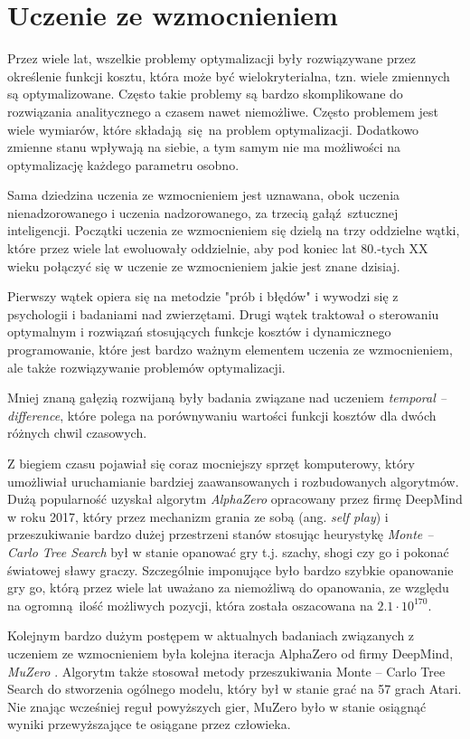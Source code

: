 \chapter{Uczenie ze wzmocnieniem}
\label{cha:rozdzial3}

Przez wiele lat, wszelkie problemy optymalizacji były rozwiązywane przez 
określenie funkcji kosztu, która może być wielokryterialna, tzn. wiele 
zmiennych są optymalizowane. Często takie problemy są bardzo skomplikowane do 
rozwiązania analitycznego a czasem nawet niemożliwe. Często problemem jest 
wiele wymiarów, które składają się na problem optymalizacji. Dodatkowo zmienne 
stanu wpływają na siebie, a tym samym nie ma możliwości na optymalizację 
każdego parametru osobno.

Sama dziedzina uczenia ze wzmocnieniem jest uznawana, obok uczenia 
nienadzorowanego i uczenia nadzorowanego, za trzecią gałąź sztucznej 
inteligencji. Początki uczenia ze wzmocnieniem się dzielą na trzy oddzielne 
wątki, które przez wiele lat ewoluowały oddzielnie, aby pod koniec lat 80.-tych 
XX wieku połączyć się w uczenie ze wzmocnieniem jakie jest znane dzisiaj.

Pierwszy wątek opiera się na metodzie "prób i błędów" i wywodzi się z 
psychologii i badaniami nad zwierzętami. Drugi wątek traktował o sterowaniu 
optymalnym i rozwiązań stosujących funkcje kosztów i dynamicznego 
programowanie, które jest bardzo ważnym elementem uczenia ze wzmocnieniem, ale 
także rozwiązywanie problemów optymalizacji.

Mniej znaną gałęzią rozwijaną były badania związane nad uczeniem 
\textit{temporal -- difference}, które polega na porównywaniu wartości funkcji 
kosztów dla dwóch różnych chwil czasowych. 

Z biegiem czasu pojawiał się coraz mocniejszy sprzęt komputerowy, który 
umożliwiał uruchamianie bardziej zaawansowanych i rozbudowanych algorytmów. 
Dużą popularność uzyskał algorytm \textit{AlphaZero} opracowany przez firmę 
DeepMind w roku 2017, który przez mechanizm grania ze sobą (ang. \textit{self 
play}) i przeszukiwanie bardzo dużej przestrzeni stanów stosując heurystykę 
\textit{Monte -- Carlo Tree Search} był w stanie opanować gry t.j. szachy, 
shogi czy go i pokonać światowej sławy graczy. Szczególnie imponujące było 
bardzo szybkie opanowanie gry go, którą przez wiele lat uważano za niemożliwą 
do opanowania, ze względu na ogromną ilość możliwych pozycji, która została 
oszacowana na $2.1 \cdot 10^{170}$. 

Kolejnym bardzo dużym postępem w aktualnych badaniach związanych z uczeniem ze 
wzmocnieniem była kolejna iteracja AlphaZero od firmy DeepMind, \textit{MuZero} 
\cite{mu_zero}. Algorytm także stosował metody przeszukiwania Monte -- Carlo 
Tree Search do stworzenia ogólnego modelu, który był w stanie grać na 57 grach 
Atari. Nie znając wcześniej reguł powyższych gier, MuZero było w stanie 
osiągnąć wyniki przewyższające te osiągane przez człowieka. 

